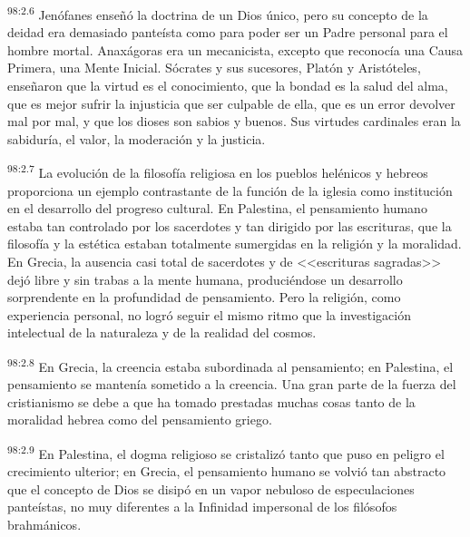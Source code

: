 \par
\textsuperscript{98:2.6} Jenófanes enseñó la doctrina de un Dios único, pero su concepto de la deidad era demasiado panteísta como para poder ser un Padre personal para el hombre mortal. Anaxágoras era un mecanicista, excepto que reconocía una Causa Primera, una Mente Inicial. Sócrates y sus sucesores, Platón y Aristóteles, enseñaron que la virtud es el conocimiento, que la bondad es la salud del alma, que es mejor sufrir la injusticia que ser culpable de ella, que es un error devolver mal por mal, y que los dioses son sabios y buenos. Sus virtudes cardinales eran la sabiduría, el valor, la moderación y la justicia.

\par
\textsuperscript{98:2.7} La evolución de la filosofía religiosa en los pueblos helénicos y hebreos proporciona un ejemplo contrastante de la función de la iglesia como institución en el desarrollo del progreso cultural. En Palestina, el pensamiento humano estaba tan controlado por los sacerdotes y tan dirigido por las escrituras, que la filosofía y la estética estaban totalmente sumergidas en la religión y la moralidad. En Grecia, la ausencia casi total de sacerdotes y de <<escrituras sagradas>> dejó libre y sin trabas a la mente humana, produciéndose un desarrollo sorprendente en la profundidad de pensamiento. Pero la religión, como experiencia personal, no logró seguir el mismo ritmo que la investigación intelectual de la naturaleza y de la realidad del cosmos.

\par
\textsuperscript{98:2.8} En Grecia, la creencia estaba subordinada al pensamiento; en Palestina, el pensamiento se mantenía sometido a la creencia. Una gran parte de la fuerza del cristianismo se debe a que ha tomado prestadas muchas cosas tanto de la moralidad hebrea como del pensamiento griego.

\par
\textsuperscript{98:2.9} En Palestina, el dogma religioso se cristalizó tanto que puso en peligro el crecimiento ulterior; en Grecia, el pensamiento humano se volvió tan abstracto que el concepto de Dios se disipó en un vapor nebuloso de especulaciones panteístas, no muy diferentes a la Infinidad impersonal de los filósofos brahmánicos.


